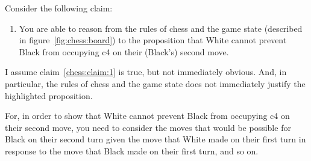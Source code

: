 \documentclass[10pt]{article}
\begin{document}
Consider the following claim:
\begin{enumerate}
\item\label{chess:claim:1} You are able to reason from the rules of chess and the game state (described in figure~\ref{fig:chess:board}) to the proposition that White cannot prevent Black from occupying c4 on their (Black's) second move.
\end{enumerate}
I assume claim~\ref{chess:claim:1} is true, but not immediately obvious.
And, in particular, the rules of chess and the game state does not immediately justify the highlighted proposition.

For, in order to show that White cannot prevent Black from occupying c4 on their second move, you need to consider the moves that would be possible for Black on their second turn given the move that White made on their first turn in response to the move that Black made on their first turn, and so on.
\end{document}
